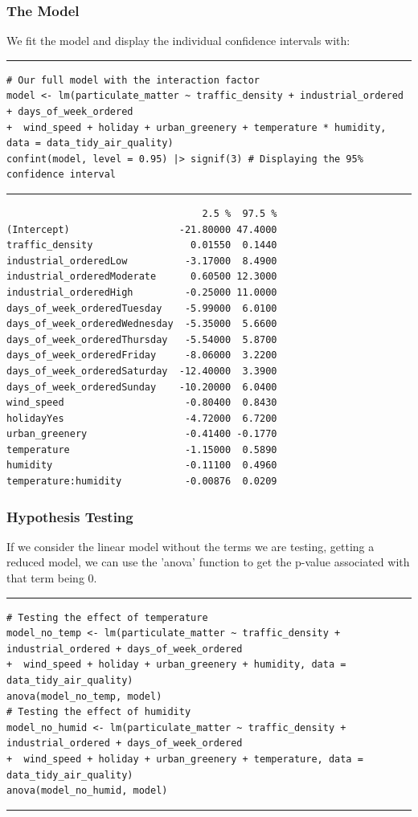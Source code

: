 \documentclass{article}
\begin{document}
\subsubsection*{The Model}
We fit the model and display the individual confidence intervals with:
\par\noindent\rule{\textwidth}{0.4pt}
\vspace{-25pt} %
\begin{verbatim}
# Our full model with the interaction factor
model <- lm(particulate_matter ~ traffic_density + industrial_ordered + days_of_week_ordered 
+  wind_speed + holiday + urban_greenery + temperature * humidity, data = data_tidy_air_quality)
confint(model, level = 0.95) |> signif(3) # Displaying the 95% confidence interval
\end{verbatim}
\vspace{-15pt} %
\par\noindent\rule{\textwidth}{0.4pt}
\begin{verbatim}
                                  2.5 %  97.5 %
(Intercept)                   -21.80000 47.4000
traffic_density                 0.01550  0.1440
industrial_orderedLow          -3.17000  8.4900
industrial_orderedModerate      0.60500 12.3000
industrial_orderedHigh         -0.25000 11.0000
days_of_week_orderedTuesday    -5.99000  6.0100
days_of_week_orderedWednesday  -5.35000  5.6600
days_of_week_orderedThursday   -5.54000  5.8700
days_of_week_orderedFriday     -8.06000  3.2200
days_of_week_orderedSaturday  -12.40000  3.3900
days_of_week_orderedSunday    -10.20000  6.0400
wind_speed                     -0.80400  0.8430
holidayYes                     -4.72000  6.7200
urban_greenery                 -0.41400 -0.1770
temperature                    -1.15000  0.5890
humidity                       -0.11100  0.4960
temperature:humidity           -0.00876  0.0209
\end{verbatim}
\subsubsection*{Hypothesis Testing}
If we consider the linear model without the terms we are testing, getting a reduced model, we can use the 'anova' function to get the p-value associated with that term being 0.
\par\noindent\rule{\textwidth}{0.4pt}
\vspace{-25pt} %
\begin{verbatim}
# Testing the effect of temperature
model_no_temp <- lm(particulate_matter ~ traffic_density + industrial_ordered + days_of_week_ordered 
+  wind_speed + holiday + urban_greenery + humidity, data = data_tidy_air_quality)
anova(model_no_temp, model)
# Testing the effect of humidity
model_no_humid <- lm(particulate_matter ~ traffic_density + industrial_ordered + days_of_week_ordered 
+  wind_speed + holiday + urban_greenery + temperature, data = data_tidy_air_quality)
anova(model_no_humid, model)
\end{verbatim}
\vspace{-15pt} %
\par\noindent\rule{\textwidth}{0.4pt}
\end{document}
